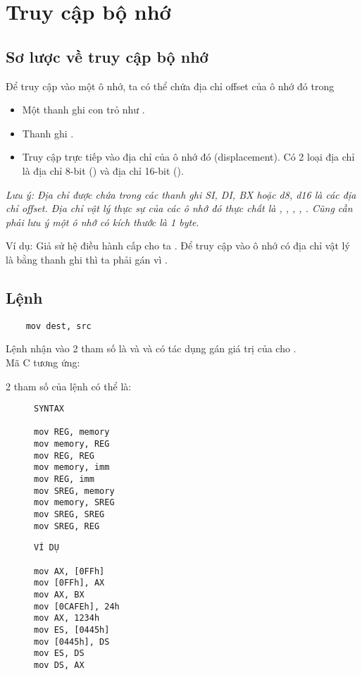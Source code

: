 \documentclass[main.tex]{subfiles}
\begin{document}
\section{Truy cập bộ nhớ}
\subsection{Sơ lược về truy cập bộ nhớ}
Để truy cập vào một ô nhớ, ta có thể chứa địa chỉ offset của ô nhớ đó trong
\begin{itemize}
    \item Một thanh ghi con trỏ như .
    \item Thanh ghi .
    \item Truy cập trực tiếp vào địa chỉ của ô nhớ đó (displacement). Có 2 loại địa chỉ là địa chỉ 8-bit () và địa chỉ 16-bit ().
\end{itemize}

\textit{Lưu ý: Địa chỉ được chứa trong các thanh ghi SI, DI, BX hoặc d8, d16 là các địa chỉ offset. Địa chỉ vật lý thực sự của các ô nhớ đó thực chất là , , , , . Cũng cần phải lưu ý một ô nhớ có kích thước là 1 byte}.
\bigskip

Ví dụ: Giả sử hệ điều hành cấp cho ta .
Để truy cập vào ô nhớ có địa chỉ vật lý là  bằng thanh ghi  thì ta phải gán  vì .

\subsection{Lệnh }
\begin{verbatim}
    mov dest, src
\end{verbatim}
Lệnh  nhận vào 2 tham số là  và  và có tác dụng gán giá trị của  cho .\\
Mã C tương ứng: 

2 tham số của lệnh  có thể là:
\begin{figure}[H]
    \begin{minipage}{0.5\textwidth}
\begin{verbatim}
SYNTAX 

mov REG, memory
mov memory, REG
mov REG, REG
mov memory, imm
mov REG, imm
mov SREG, memory
mov memory, SREG 
mov SREG, SREG 
mov SREG, REG
\end{verbatim}
    \end{minipage}
    \hfill
        \begin{minipage}{0.5\textwidth}
\begin{verbatim}
VÍ DỤ 

mov AX, [0FFh]
mov [0FFh], AX
mov AX, BX
mov [0CAFEh], 24h
mov AX, 1234h
mov ES, [0445h]
mov [0445h], DS 
mov ES, DS 
mov DS, AX
\end{verbatim}         
         \end{minipage}
\end{figure}
\end{document}
